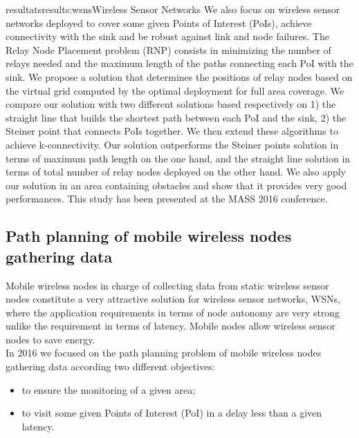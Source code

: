 \documentclass{ra2016}
\begin{document}
\begin{module}{resultats}{results:wsns}{Wireless Sensor Networks}
We also focus on wireless sensor networks deployed to cover some given Points of Interest (PoIs), achieve connectivity with the sink and be robust against link and node failures. 
The Relay Node Placement problem (RNP) consists in minimizing the number of relays needed and the maximum length of the paths connecting each PoI with the sink. 
We propose a solution that determines the positions of relay nodes based on the virtual grid computed by the optimal deployment for full area coverage.  We compare our solution with two different solutions based respectively on 1) the straight line that builds the shortest path between each PoI and the sink, 2) the Steiner point that connects PoIs together. We then extend these algorithms to achieve k-connectivity. Our solution outperforms the Steiner points solution in terms of maximum path length on the one hand, and the straight line solution in terms of total number of relay nodes deployed on the other hand. We also apply our solution in an area containing obstacles and show that it provides very good performances. This study has been presented at the MASS 2016 conference.  \\

\subsection{Path planning of mobile wireless nodes gathering data}
\begin{participants}
\end{participants}

Mobile wireless nodes in charge of collecting data from static wireless sensor nodes constitute a very attractive solution for wireless sensor networks, WSNs, where the application requirements in terms of node autonomy are very strong unlike the requirement in terms of latency. Mobile nodes allow wireless sensor nodes to save energy.\\

In 2016 we focused on the path planning problem of mobile wireless nodes gathering data according two different objectives:
\begin{itemize}
\item to ensure the monitoring of a given area;
\item to visit some given Points of Interest (PoI) in a delay less than a given latency.\\
\end{itemize}


\end{module}
\end{document}
